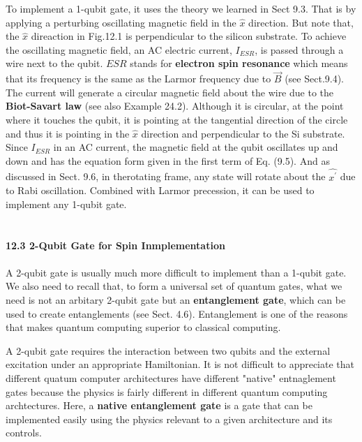 \documentclass{article}
\begin{document}
To implement a 1-qubit gate, it uses the theory we learned in Sect 9.3. That is by applying a perturbing oscillating
magnetic field in the $\hat{x}$ direction. But note that, the $\hat{x}$ direaction in Fig.12.1 is perpendicular to the silicon substrate.
To achieve the oscillating magnetic field, an AC electric current, $I_{ESR}$, is passed through
a wire next to the qubit. $ESR$ stands for \textbf{electron spin resonance} which means that its
frequency is the same as the Larmor frequency due to $\vec{B}$ (see Sect.9.4). The current will generate a circular
magnetic field about the wire due to the \textbf{Biot-Savart law} (see
also Example 24.2). Although it is circular, at the point where it touches the qubit, it is pointing
at the tangential direction of the circle and thus it is pointing in the $\hat{x}$ direction and perpendicular
to the Si substrate. Since $I_{ESR}$ in an AC current, the magnetic field at the qubit oscillates up and down
and has the equation form given in the first term of Eq. (9.5). And as discussed in Sect. 9.6, in therotating frame,
any state will rotate about the $\hat{x^\prime}$ due to Rabi oscillation. Combined with Larmor precession, it can be used
to implement any 1-qubit gate.\\\\\\
\textbf{\large 12.3 2-Qubit Gate for Spin Inmplementation}\\\\
A 2-qubit gate is usually much more difficult to implement than a 1-qubit gate. We also need to recall that, to form
a universal set of quantum gates, what we need is not an arbitary 2-qubit gate but an \textbf{entanglement gate}, which 
can be used to create entanglements (see Sect. 4.6). Entanglement is one of the reasons that makes quantum computing superior
to classical computing.

A 2-qubit gate requires the interaction between two qubits and the external excitation under an appropriate Hamiltonian.
It is not difficult to appreciate that different quatum computer architectures have different "native" entnaglement gates because 
the physics is fairly different in different quantum computing archtectures. Here, a \textbf{native entanglement gate} is a gate that 
can be implemented easily using the physics relevant to a given architecture and its controls.
\end{document}
